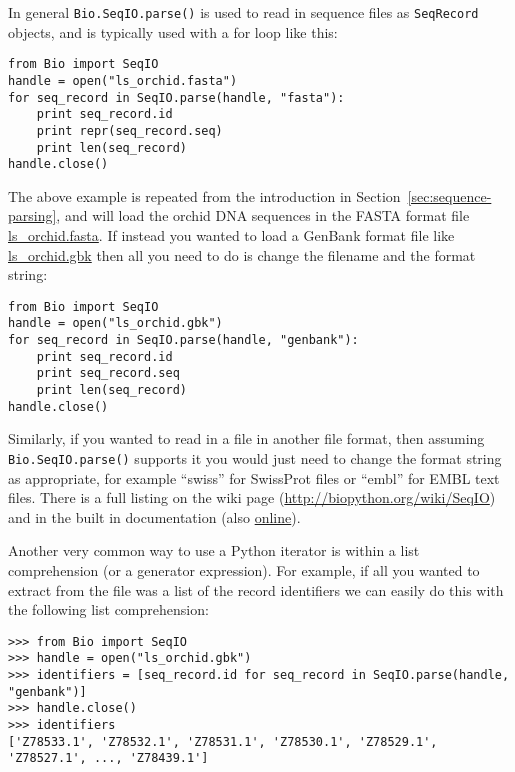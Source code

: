 \documentclass{report}
\begin{document}
In general \verb|Bio.SeqIO.parse()| is used to read in sequence files as \verb|SeqRecord| objects, and is typically used with a for loop like this:

\begin{verbatim}
from Bio import SeqIO
handle = open("ls_orchid.fasta")
for seq_record in SeqIO.parse(handle, "fasta"):
    print seq_record.id
    print repr(seq_record.seq)
    print len(seq_record)
handle.close()
\end{verbatim}

The above example is repeated from the introduction in Section~\ref{sec:sequence-parsing}, and will load the orchid DNA sequences in the FASTA format file \href{http://biopython.org/DIST/docs/tutorial/examples/ls_orchid.fasta}{ls\_orchid.fasta}.  If instead you wanted to load a GenBank format file like \href{http://biopython.org/DIST/docs/tutorial/examples/ls_orchid.gbk}{ls\_orchid.gbk} then all you need to do is change the filename and the format string:

\begin{verbatim}
from Bio import SeqIO
handle = open("ls_orchid.gbk")
for seq_record in SeqIO.parse(handle, "genbank"):
    print seq_record.id
    print seq_record.seq
    print len(seq_record)
handle.close()
\end{verbatim}

Similarly, if you wanted to read in a file in another file format, then assuming \verb|Bio.SeqIO.parse()| supports it you would just need to change the format string as appropriate, for example ``swiss'' for SwissProt files or ``embl'' for EMBL text files. There is a full listing on the wiki page (\url{http://biopython.org/wiki/SeqIO}) and in the built in documentation (also \href{http://biopython.org/DIST/docs/api/Bio.SeqIO-module.html}{online}).

Another very common way to use a Python iterator is within a list comprehension (or
a generator expression).  For example, if all you wanted to extract from the file was
a list of the record identifiers we can easily do this with the following list comprehension:

\begin{verbatim}
>>> from Bio import SeqIO
>>> handle = open("ls_orchid.gbk")
>>> identifiers = [seq_record.id for seq_record in SeqIO.parse(handle, "genbank")]
>>> handle.close()
>>> identifiers
['Z78533.1', 'Z78532.1', 'Z78531.1', 'Z78530.1', 'Z78529.1', 'Z78527.1', ..., 'Z78439.1']
\end{verbatim}
\end{document}
